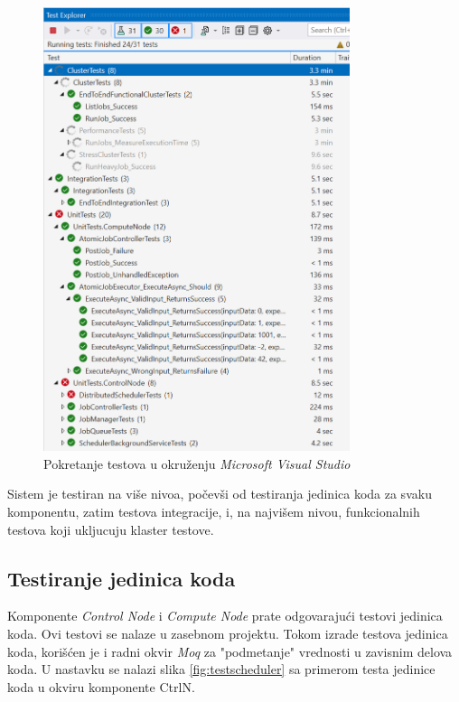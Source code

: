 \documentclass[12pt,oneside]{memoir}
\begin{document}
\begin{figure}[!ht]
  \centering
  \includegraphics[width=0.8\textwidth]{./images/testexplorer.png}
  \caption{Pokretanje testova u okruženju \emph{Microsoft Visual Studio}}
  \label{fig:testexplorer}
\end{figure}

Sistem je testiran na više nivoa, počevši od testiranja jedinica koda za svaku komponentu, zatim testova integracije, i, na najvišem nivou, funkcionalnih testova koji ukljucuju klaster testove.

\subsection{Testiranje jedinica koda}
Komponente \emph{Control Node} i \emph{Compute Node} prate odgovarajući testovi jedinica koda. Ovi testovi se nalaze u zasebnom projektu. Tokom izrade testova jedinica koda, korišćen je i radni okvir \emph{Moq} \cite{Moq} za "podmetanje" vrednosti u zavisnim delova koda. U nastavku se nalazi slika \ref{fig:testscheduler} sa primerom testa jedinice koda u okviru komponente CtrlN.
\end{document}
